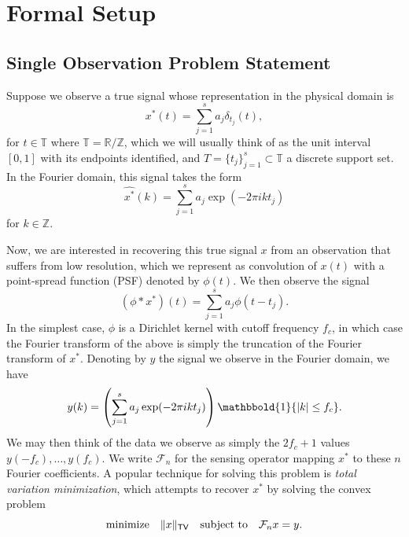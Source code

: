 \documentclass[11pt]{article}
\newcommand{\RR}{\mathbb{R}}
\newcommand{\TT}{\mathbb{T}}
\newcommand{\ZZ}{\mathbb{Z}}
\newcommand{\One}{\mathbbold{1}}
\newcommand{\sF}{\mathcal{F}}
\newcommand{\HS}{\hspace{3.5mm}}
\begin{document}
\section{Formal Setup}

\subsection{Single Observation Problem Statement}

Suppose we observe a true signal whose representation in the physical domain is
\begin{equation}
    x^*(t) = \sum_{j = 1}^s a_j \delta_{t_j}(t),
\end{equation}
for $t \in \TT$ where $\TT = \RR / \ZZ$, which we will usually think of as the unit interval $[0, 1]$ with its endpoints identified, and $T = \{t_j\}_{j = 1}^s \subset \TT$ a discrete support set.
In the Fourier domain, this signal takes the form
\begin{equation}
    \widehat{x^*}(k) = \sum_{j = 1}^s a_j \exp(-2\pi i k t_j)
\end{equation}
for $k \in \ZZ$.

Now, we are interested in recovering this true signal $x$ from an observation that suffers from low resolution, which we represent as convolution of $x(t)$ with a point-spread function (PSF) denoted by $\phi(t)$.
We then observe the signal
\begin{equation}
    (\phi * x^*)(t) = \sum_{j = 1}^sa_j \phi(t - t_j).
\end{equation}
In the simplest case, $\phi$ is a Dirichlet kernel with cutoff frequency $f_c$, in which case the Fourier transform of the above is simply the truncation of the Fourier transform of $x^*$.
Denoting by $y$ the signal we observe in the Fourier domain, we have
\begin{equation}
    y(k) = \left(\sum_{j = 1}^s a_j \exp(-2\pi i k t_j)\right)\One\{|k| \leq f_c \}.
\end{equation}
We may then think of the data we observe as simply the $2f_c + 1$ values $y(-f_c), \dots, y(f_c)$.
We write $\sF_n$ for the sensing operator mapping $x^*$ to these $n$ Fourier coefficients.
A popular technique for solving this problem is \emph{total variation minimization}, which attempts to recover $x^*$ by solving the convex problem
\begin{equation}
    \mathrm{minimize} \HS \|x\|_{\mathsf{TV}} \HS \mathrm{subject\ to} \HS \sF_nx = y.
\end{equation}
\end{document}
